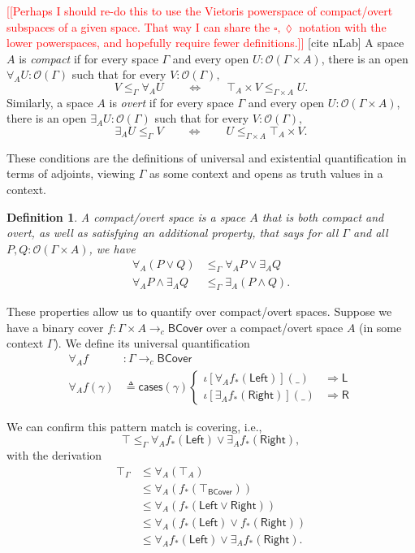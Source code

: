 \documentclass[conference]{IEEEtran}
\newtheorem{definition}{Definition}
\newcommand{\cto}{\to_c}
\newcommand{\Open}[1]{\mathcal{O}({#1})}
\newcommand{\wildcard}{\_}
\newcommand{\oinclf}[1]{\iota[{#1}]}
\newcommand{\oincl}[2]{\oinclf{#1} \left({#2}\right)}
\newcommand{\Branch}{\Rightarrow}
\newcommand{\note}[1]{\textcolor{red}{[[{#1}]]}}
\begin{document}
\note{Perhaps I should re-do this to use the Vietoris powerspace of compact/overt subspaces of a given space. That way I can share the $\square, \lozenge$ notation with the lower powerspaces, and hopefully require fewer definitions.}
[cite nLab]
A space $A$ is \emph{compact} if for every space $\Gamma$ and every open $U : \Open{\Gamma \times A}$, there is an open $\forall_A U : \Open{\Gamma}$ such that for every $V : \Open{\Gamma},$
\[
V \le_\Gamma \forall_A U \qquad \Leftrightarrow \qquad \top_A \times V \le_{\Gamma \times A} U.
\]
Similarly, a space $A$ is \emph{overt} if for every space $\Gamma$ and every open $U : \Open{\Gamma \times A}$, there is an open $\exists_A U : \Open{\Gamma}$ such that for every $V : \Open{\Gamma},$
\[
\exists_A U \le_\Gamma V  \qquad \Leftrightarrow \qquad U  \le_{\Gamma \times A} \top_A \times V.
\]

These conditions are the definitions of universal and existential quantification in terms of adjoints, viewing $\Gamma$ as some context and opens as truth values in a context.

\begin{definition}
A \emph{compact/overt} space is a space $A$ that is both compact and overt, as well as satisfying an additional property, that says for all $\Gamma$ and all $P, Q : \Open{\Gamma \times A}$, we have
\begin{align*}
\forall_A(P \vee Q) &\le_\Gamma \forall_A P \vee \exists_A Q
\\  \forall_A P \wedge \exists_A Q &\le_\Gamma \exists_A (P \wedge Q).
\end{align*}
\end{definition}
These properties allow us to quantify over compact/overt spaces. Suppose we have a binary cover $f : \Gamma \times A \cto \mathsf{BCover}$ over a compact/overt space $A$ (in some context $\Gamma$). We define its universal quantification
\begin{align*}
\forall_A f &: \Gamma \cto \mathsf{BCover}
\\ \forall_A f(\gamma) &\triangleq \mathsf{cases}(\mathsf{\gamma})
\begin{cases}
\oincl{\forall_A f_*(\mathsf{Left})}{\wildcard} &\Branch \mathsf{L}
\\ \oincl{\exists_A f_*(\mathsf{Right})}{\wildcard} &\Branch \mathsf{R}
\end{cases}
\end{align*}

We can confirm this pattern match is covering, i.e.,
\[
\top \le_\Gamma \forall_A f_*(\mathsf{Left}) \vee \exists_A f_*(\mathsf{Right}),
\]
with the derivation
\begin{align*}
\top_\Gamma 
  &\le \forall_A (\top_A) \tag{$\forall_A$ adjointness}
\\ &\le \forall_A (f_*(\top_\mathsf{BCover})) \tag{$f_*$ preserves $\top$}
\\ &\le \forall_A (f_*(\mathsf{Left} \vee \mathsf{Right}))
\\ &\le \forall_A(f_*(\mathsf{Left}) \vee f_*(\mathsf{Right}))  \tag{$f_*$ preserves joins}
\\ &\le \forall_A f_*(\mathsf{Left}) \vee \exists_A f_*(\mathsf{Right}) \tag{$A$ is compact/overt}.
\end{align*}
\end{document}
